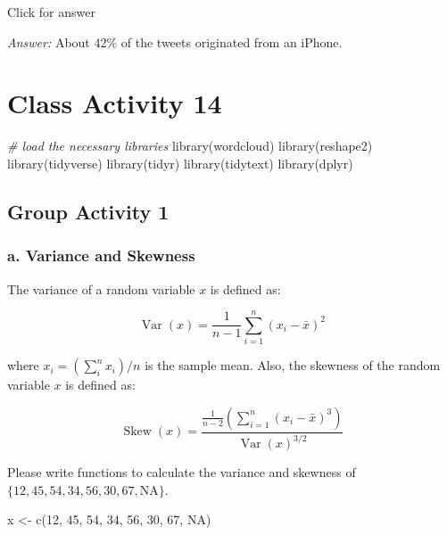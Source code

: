 \documentclass[
]{book}
\newenvironment{Shaded}{\begin{snugshade}}{\end{snugshade}}
\newcommand{\CommentTok}[1]{\textcolor[rgb]{0.56,0.35,0.01}{\textit{#1}}}
\newcommand{\ConstantTok}[1]{\textcolor[rgb]{0.00,0.00,0.00}{#1}}
\newcommand{\DecValTok}[1]{\textcolor[rgb]{0.00,0.00,0.81}{#1}}
\newcommand{\FunctionTok}[1]{\textcolor[rgb]{0.00,0.00,0.00}{#1}}
\newcommand{\NormalTok}[1]{#1}
\newcommand{\OtherTok}[1]{\textcolor[rgb]{0.56,0.35,0.01}{#1}}
\begin{document}
Click for answer

\emph{Answer:} About 42\% of the tweets originated from an iPhone.

\hypertarget{class-activity-14}{%
\chapter{Class Activity 14}\label{class-activity-14}}

\begin{Shaded}
\begin{Highlighting}[]
\CommentTok{\# load the necessary libraries}
\FunctionTok{library}\NormalTok{(wordcloud)}
\FunctionTok{library}\NormalTok{(reshape2)}
\FunctionTok{library}\NormalTok{(tidyverse)}
\FunctionTok{library}\NormalTok{(tidyr)}
\FunctionTok{library}\NormalTok{(tidytext)}
\FunctionTok{library}\NormalTok{(dplyr)}
\end{Highlighting}
\end{Shaded}

\hypertarget{group-activity-1-1}{%
\section{Group Activity 1}\label{group-activity-1-1}}

\hypertarget{a.-variance-and-skewness}{%
\subsection{a. Variance and Skewness}\label{a.-variance-and-skewness}}

The variance of a random variable \(x\) is defined as:

\[\operatorname{Var}(x)=\frac{1}{n-1} \sum_{i=1}^{n}\left(x_{i}-\bar{x}\right)^{2}\]

where \(x_i = (\sum_i^n x_i)/n\) is the sample mean. Also, the skewness of the random variable \(x\) is defined as:

\[\operatorname{Skew}(x)=\frac{\frac{1}{n-2}\left(\sum_{i=1}^{n}\left(x_{i}-\bar{x}\right)^{3}\right)}{\operatorname{Var}(x)^{3 /2}}\]

Please write functions to calculate the variance and skewness of \(\{12, 45, 54, 34, 56, 30, 67, \text{NA}\}\).

\begin{Shaded}
\begin{Highlighting}[]
\NormalTok{x }\OtherTok{\textless{}{-}} \FunctionTok{c}\NormalTok{(}\DecValTok{12}\NormalTok{, }\DecValTok{45}\NormalTok{, }\DecValTok{54}\NormalTok{, }\DecValTok{34}\NormalTok{, }\DecValTok{56}\NormalTok{, }\DecValTok{30}\NormalTok{, }\DecValTok{67}\NormalTok{, }\ConstantTok{NA}\NormalTok{)}
\end{Highlighting}
\end{Shaded}
\end{document}
